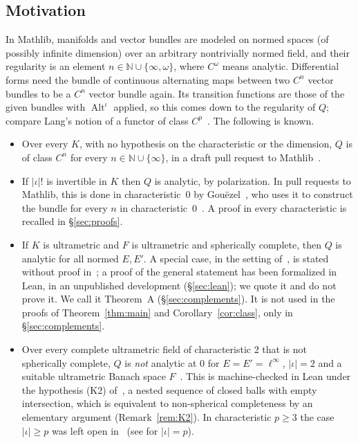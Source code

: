 \documentclass[11pt]{amsart}
\theoremstyle{definition}
\theoremstyle{remark}
\numberwithin{equation}{section}
\newcommand{\linf}{\ell^\infty}
\newcommand{\N}{\mathbb{N}}
\newcommand{\Alt}{\operatorname{Alt}}
\newcommand{\abs}[1]{\lvert #1\rvert}
\begin{document}
\subsection*{Motivation}
In Mathlib, manifolds and vector bundles are modeled on normed spaces (of possibly infinite dimension) over an
arbitrary nontrivially normed field, and their regularity is an element $n\in\N\cup\{\infty,\omega\}$, where $C^\omega$
means analytic. Differential forms need the bundle of continuous alternating maps between two $C^n$ vector bundles to
be a $C^n$ vector bundle again. Its transition functions are those of the given bundles with $\Alt^\iota$ applied, so
this comes down to the regularity of $Q$; compare Lang's notion of a functor of class $C^p$~\cite[Ch.~III, \S4]{La}.
The following is known.
\begin{itemize}
\item Over every $K$, with no hypothesis on the characteristic or the dimension, $Q$ is of class $C^n$ for every
$n\in\N\cup\{\infty\}$, in a draft pull request to Mathlib~\cite{PR}.
\item If $\abs\iota!$ is invertible in $K$ then $Q$ is analytic, by polarization. In pull requests to Mathlib, this is
done in characteristic~$0$ by Gou\"ezel~\cite{G1}, who uses it to construct the bundle for every $n$ in
characteristic~$0$~\cite{G2}. A proof in every characteristic is recalled in \S\ref{sec:proofs}.
\item If $K$ is ultrametric and $F$ is ultrametric and spherically complete, then $Q$ is analytic for all normed
$E,E'$. A special case, in the setting of~\cite{M}, is stated without proof in~\cite[Remark~16]{M}; a proof of the
general statement has been formalized in Lean, in an unpublished development (\S\ref{sec:lean}); we quote it and do not
prove it. We call it Theorem~A (\S\ref{sec:complements}). It is not used in the proofs of
Theorem~\ref{thm:main} and Corollary~\ref{cor:class}, only in \S\ref{sec:complements}.
\item Over every complete ultrametric field of characteristic $2$ that is not spherically complete, $Q$ is \emph{not}
analytic at $0$ for $E=E'=\linf$, $\abs\iota=2$ and a suitable ultrametric Banach space $F$~\cite{M}. This is
machine-checked in Lean under the hypothesis (K2) of~\cite{M}, a nested sequence of closed balls with empty
intersection, which is equivalent to non-spherical completeness by an elementary argument
(Remark~\ref{rem:K2}). In characteristic $p\ge3$ the case $\abs\iota\ge p$ was left open in~\cite{M} (see
\cite[Remark~18]{M} for $\abs\iota=p$).
\end{itemize}
\end{document}
